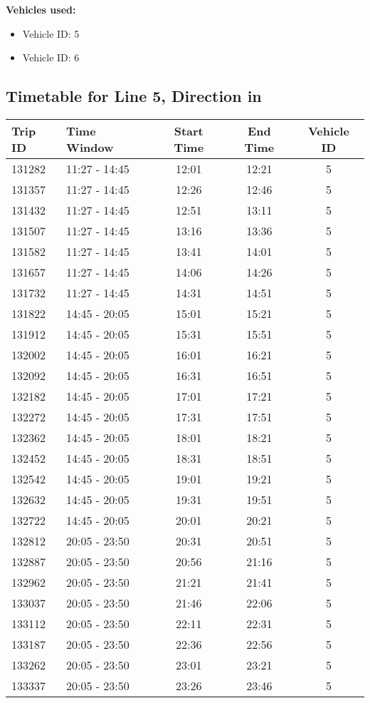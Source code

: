 \documentclass{article}
\begin{document}
\textbf{Vehicles used:}
\begin{itemize}
  \item Vehicle ID: 5
  \item Vehicle ID: 6
\end{itemize}

\subsection*{Timetable for Line 5, Direction in}
\begin{tabular}{llccc}
\toprule
Trip ID & Time Window & Start Time & End Time & Vehicle ID \\
\midrule
131282 & 11:27 - 14:45 & 12:01 & 12:21 & 5 \\
131357 & 11:27 - 14:45 & 12:26 & 12:46 & 5 \\
131432 & 11:27 - 14:45 & 12:51 & 13:11 & 5 \\
131507 & 11:27 - 14:45 & 13:16 & 13:36 & 5 \\
131582 & 11:27 - 14:45 & 13:41 & 14:01 & 5 \\
131657 & 11:27 - 14:45 & 14:06 & 14:26 & 5 \\
131732 & 11:27 - 14:45 & 14:31 & 14:51 & 5 \\
131822 & 14:45 - 20:05 & 15:01 & 15:21 & 5 \\
131912 & 14:45 - 20:05 & 15:31 & 15:51 & 5 \\
132002 & 14:45 - 20:05 & 16:01 & 16:21 & 5 \\
132092 & 14:45 - 20:05 & 16:31 & 16:51 & 5 \\
132182 & 14:45 - 20:05 & 17:01 & 17:21 & 5 \\
132272 & 14:45 - 20:05 & 17:31 & 17:51 & 5 \\
132362 & 14:45 - 20:05 & 18:01 & 18:21 & 5 \\
132452 & 14:45 - 20:05 & 18:31 & 18:51 & 5 \\
132542 & 14:45 - 20:05 & 19:01 & 19:21 & 5 \\
132632 & 14:45 - 20:05 & 19:31 & 19:51 & 5 \\
132722 & 14:45 - 20:05 & 20:01 & 20:21 & 5 \\
132812 & 20:05 - 23:50 & 20:31 & 20:51 & 5 \\
132887 & 20:05 - 23:50 & 20:56 & 21:16 & 5 \\
132962 & 20:05 - 23:50 & 21:21 & 21:41 & 5 \\
133037 & 20:05 - 23:50 & 21:46 & 22:06 & 5 \\
133112 & 20:05 - 23:50 & 22:11 & 22:31 & 5 \\
133187 & 20:05 - 23:50 & 22:36 & 22:56 & 5 \\
133262 & 20:05 - 23:50 & 23:01 & 23:21 & 5 \\
133337 & 20:05 - 23:50 & 23:26 & 23:46 & 5 \\
\bottomrule
\end{tabular}
\end{document}
